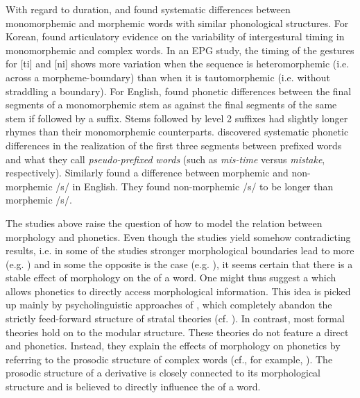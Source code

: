 With regard to duration, \cite{Cho.2001,Sugahara.2009,Hanique.2011,Smith.2012} and \cite{Plag.2017} found systematic differences between monomorphemic and morphemic words with similar phonological structures. For Korean, \cite{Cho.2001} found articulatory evidence on the variability of intergestural timing in monomorphemic and complex words. In an EPG study, the timing of the gestures for [ti] and [ni] shows more variation when the sequence is heteromorphemic (i.e. across a morpheme-boundary) than when it is tautomorphemic (i.e. without straddling a boundary).
For English, \citet{Sugahara.2009} found phonetic differences between the final segments of a monomorphemic stem as against the final segments of the same stem if followed by a suffix. Stems followed by level 2 suffixes had slightly longer rhymes than their monomorphemic counterparts. \citet{Smith.2012} discovered systematic phonetic differences in the realization of the first three segments between prefixed words and what they call \textit{pseudo-prefixed words} (such as \textit{mis-time} versus \textit{mistake}, respectively). Similarly \cite{Plag.2017} found a difference between morphemic and non-morphemic /s/ in English. They found non-morphemic /s/ to be longer than morphemic /s/. 


The studies above raise the question of how to model the relation between morphology and phonetics. Even though the studies yield somehow contradicting results, i.e. in some of the studies stronger morphological boundaries lead to more  (e.g. \citealt{Sugahara.2009, Smith.2012}) and in some the opposite is the case (e.g. \citealt{Schuppler.2012, Plag.2017}), it seems certain that there is a stable effect of morphology on the  of a word. One might thus suggest a  which allows phonetics to directly access morphological information. This idea is picked up mainly by psycholinguistic approaches of , which completely abandon the strictly feed-forward structure of stratal theories (cf. ). 
In contrast, most formal theories hold on to the modular structure. These theories do not feature a direct  and phonetics. Instead, they explain the effects of morphology on phonetics by referring to the prosodic structure of complex words (cf., for example, \citealt{Booij.1983b,Sproat.1993,Nespor.2007,Sugahara.2009,Bergmann.}). The prosodic structure of a derivative is closely connected to its morphological structure and is believed to directly influence the  of a word. 



